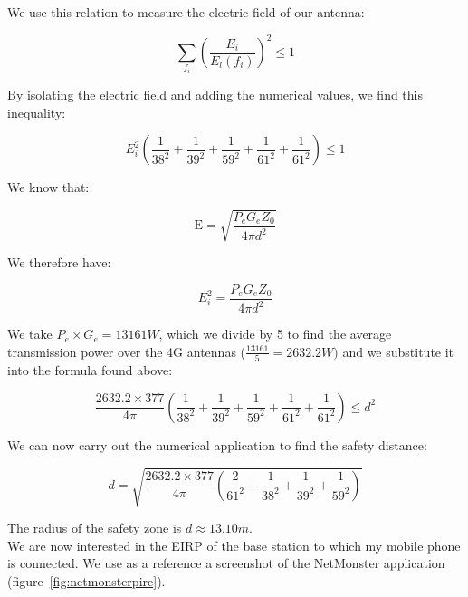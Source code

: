 \documentclass[12]{article}
\begin{document}
We use this relation to measure the electric field of our antenna:

\begin{equation*}
    \sum_{f_{i}} \left(\frac{E_{i}}{E_{l}(f_{i})}\right)^2 \leq 1
\end{equation*}

By isolating the electric field and adding the numerical values, we find this inequality:

\begin{equation*}
    E_{i}^2\left(\frac{1}{38^2} + \frac{1}{39^2} + \frac{1}{59^2} + \frac{1}{61^2} + \frac{1}{61^2} \right) \leq 1
\end{equation*}

We know that:

\begin{equation*}
    \text{E} = \sqrt{\frac{P_{e} G_{e} Z_{0}}{4 \pi d^2}}
\end{equation*}

We therefore have:

\begin{equation*}
    E_{i}^2 = \frac{P_{e} G_{e} Z_{0}}{4 \pi d^2}
\end{equation*}

We take $P_{e} \times G_{e} = 13161 W$, which we divide by 5 to find the average transmission power over the 4G antennas ($\frac{13161}{5} = 2632.2 W)$ and we substitute it into the formula found above:

\begin{equation*}
   \frac{2632.2 \times 377}{4 \pi} \left(\frac{1}{38^2} + \frac{1}{39^2} + \frac{1}{59^2} + \frac{1}{61^2} + \frac{1}{61^2}\right) \leq d^2
\end{equation*}

We can now carry out the numerical application to find the safety distance:

\begin{equation*}
    d = \sqrt{\frac{2632.2 \times 377}{4 \pi} \left(\frac{2}{61^2} + \frac{1}{38^2} + \frac{1}{39^2} + \frac{1}{59^2} \right)}
\end{equation*}

The radius of the safety zone is $d \approx 13.10m$. \\


We are now interested in the EIRP of the base station to which my mobile phone is connected. We use as a reference a screenshot of the NetMonster application (figure~\ref{fig:netmonsterpire}).
\end{document}
